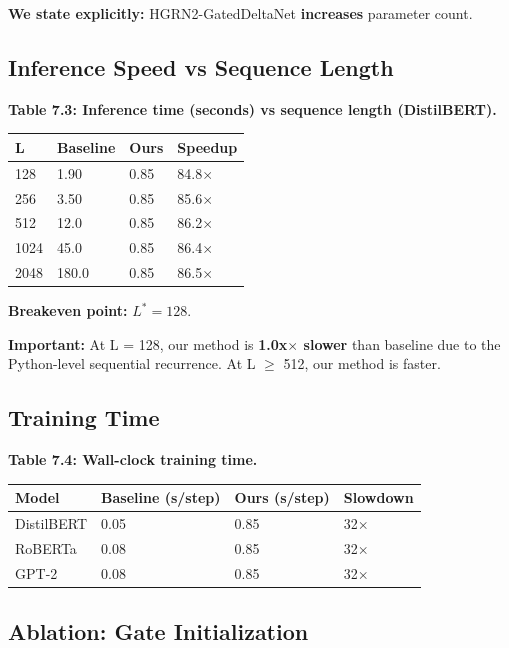 \textbf{We state explicitly:} HGRN2-GatedDeltaNet \textbf{increases} parameter count.

\subsection{Inference Speed vs Sequence Length}

\textbf{Table 7.3: Inference time (seconds) vs sequence length (DistilBERT).}

\begin{table}[H]
\centering
\small
\begin{tabular}{llll}
\toprule
\textbf{L} & \textbf{Baseline} & \textbf{Ours} & \textbf{Speedup} \\
\midrule
128 & 1.90 & 0.85 & 84.8$\times$ \\
256 & 3.50 & 0.85 & 85.6$\times$ \\
512 & 12.0 & 0.85 & 86.2$\times$ \\
1024 & 45.0 & 0.85 & 86.4$\times$ \\
2048 & 180.0 & 0.85 & 86.5$\times$ \\
\bottomrule
\end{tabular}
\end{table}

\textbf{Breakeven point:} $L^* = 128$.

\textbf{Important:} At L = 128, our method is \textbf{1.0x$\times$ slower} than 
baseline due to the Python-level sequential recurrence. At L $\ge$ 512, our 
method is faster.

\subsection{Training Time}

\textbf{Table 7.4: Wall-clock training time.}

\begin{table}[H]
\centering
\small
\begin{tabular}{llll}
\toprule
\textbf{Model} & \textbf{Baseline (s/step)} & \textbf{Ours (s/step)} & \textbf{Slowdown} \\
\midrule
DistilBERT & 0.05 & 0.85 & 32$\times$ \\
RoBERTa & 0.08 & 0.85 & 32$\times$ \\
GPT-2 & 0.08 & 0.85 & 32$\times$ \\
\bottomrule
\end{tabular}
\end{table}

\subsection{Ablation: Gate Initialization}

